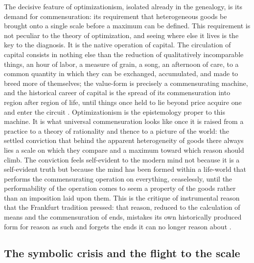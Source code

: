 The decisive feature of optimizationism, isolated already in the genealogy, is its demand for commensuration: its requirement that heterogeneous goods be brought onto a single scale before a maximum can be defined. This requirement is not peculiar to the theory of optimization, and seeing where else it lives is the key to the diagnosis. It is the native operation of capital. The circulation of capital consists in nothing else than the reduction of qualitatively incomparable things, an hour of labor, a measure of grain, a song, an afternoon of care, to a common quantity in which they can be exchanged, accumulated, and made to breed more of themselves; the value-form is precisely a commensurating machine, and the historical career of capital is the spread of its commensuration into region after region of life, until things once held to lie beyond price acquire one and enter the circuit \parencite{marx1976capital}. Optimizationism is the epistemology proper to this machine. It is what universal commensuration looks like once it is raised from a practice to a theory of rationality and thence to a picture of the world: the settled conviction that behind the apparent heterogeneity of goods there always lies a scale on which they compare and a maximum toward which reason should climb. The conviction feels self-evident to the modern mind not because it is a self-evident truth but because the mind has been formed within a life-world that performs the commensurating operation on everything, ceaselessly, until the performability of the operation comes to seem a property of the goods rather than an imposition laid upon them. This is the critique of instrumental reason that the Frankfurt tradition pressed: that reason, reduced to the calculation of means and the commensuration of ends, mistakes its own historically produced form for reason as such and forgets the ends it can no longer reason about \parencite{horkheimer2004eclipse,adornohorkheimer2002}.

\subsection*{The symbolic crisis and the flight to the scale}

